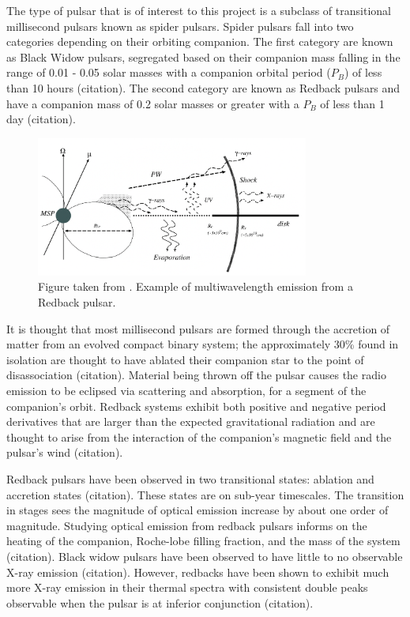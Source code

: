 The type of pulsar that is of interest to this project is a subclass of transitional millisecond pulsars known as spider pulsars. Spider pulsars fall into two categories depending on their orbiting companion. The first category are known as Black Widow pulsars, segregated based on their companion mass falling in the range of 0.01 - 0.05 solar masses with a companion orbital period ($P_B$) of less than 10 hours (citation). The second category are known as Redback pulsars and have a companion mass of 0.2 solar masses or greater with a $P_B$ of less than 1 day (citation).

\begin{figure}
\centering
\includegraphics[width=0.8\textwidth]{figs/theory/redback-multiwavelength-emission.jpg}
\caption{Figure taken from \cite{takata_multi-wavelength_2014}. Example of multiwavelength emission from a Redback pulsar.}
\end{figure}

It is thought that most millisecond pulsars are formed through the accretion of matter from an evolved compact binary system; the approximately 30\% found in isolation are thought to have ablated their companion star to the point of disassociation (citation). Material being thrown off the pulsar causes the radio emission to be eclipsed via scattering and absorption, for a segment of the companion's orbit. Redback systems exhibit both positive and negative period derivatives that are larger than the expected gravitational radiation and are thought to arise from the interaction of the companion's magnetic field and the pulsar's wind (citation).

Redback pulsars have been observed in two transitional states: ablation and accretion states (citation). These states are on sub-year timescales. The transition in stages sees the magnitude of optical emission increase by about one order of magnitude. Studying optical emission from redback pulsars informs on the heating of the companion, Roche-lobe filling fraction, and the mass of the system (citation). Black widow pulsars have been observed to have little to no observable X-ray emission (citation). However, redbacks have been shown to exhibit much more X-ray emission in their thermal spectra with consistent double peaks observable when the pulsar is at inferior conjunction (citation).

